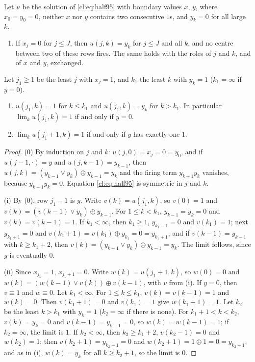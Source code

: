 \begin{lemma}\label{cl:lem:rows95}
Let $u$ be the solution of \eqref{cl:eq:half95} with boundary values $x$, $y$, where $x_0=y_0=0$, neither $x$ nor $y$ contains two consecutive $1$s, and $y_k=0$ for all large $k$.
\begin{enumerate}
\item[(0)] If $x_j=0$ for $j\le J$, then $u(j,k)=y_k$ for $j\le J$ and all $k$, and no centre between two of these rows fires. The same holds with the roles of $j$ and $k$, and of $x$ and $y$, exchanged.
\end{enumerate}
Let $j_1\ge1$ be the least $j$ with $x_j=1$, and $k_1$ the least $k$ with $y_k=1$ ($k_1=\infty$ if $y=0$).
\begin{enumerate}
\item[(i)] $u(j_1,k)=1$ for $k\le k_1$ and $u(j_1,k)=y_k$ for $k>k_1$. In particular $\lim_ku(j_1,k)=1$ if and only if $y=0$.
\item[(ii)] $\lim_ku(j_1+1,k)=1$ if and only if $y$ has exactly one $1$.
\end{enumerate}
\end{lemma}

\begin{proof}
(0) By induction on $j$ and $k$: $u(j,0)=x_j=0=y_0$, and if $u(j-1,\cdot)=y$ and $u(j,k-1)=y_{k-1}$, then $u(j,k)=(y_{k-1}\vee y_k)\oplus y_{k-1}=y_k$ and the firing term $y_{k-1}y_k$ vanishes, because $y_{k-1}y_k=0$. Equation \eqref{cl:eq:half95} is symmetric in $j$ and $k$.

(i) By (0), row $j_1-1$ is $y$. Write $v(k)=u(j_1,k)$, so $v(0)=1$ and $v(k)=(v(k-1)\vee y_k)\oplus y_{k-1}$. For $1\le k<k_1$, $y_{k-1}=y_k=0$ and $v(k)=v(k-1)=1$. If $k_1<\infty$, then $k_1\ge1$, $y_{k_1-1}=0$ and $v(k_1)=1$; next $y_{k_1+1}=0$ and $v(k_1+1)=v(k_1)\oplus y_{k_1}=0=y_{k_1+1}$; and if $v(k-1)=y_{k-1}$ with $k\ge k_1+2$, then $v(k)=(y_{k-1}\vee y_k)\oplus y_{k-1}=y_k$. The limit follows, since $y$ is eventually $0$.

(ii) Since $x_{j_1}=1$, $x_{j_1+1}=0$. Write $w(k)=u(j_1+1,k)$, so $w(0)=0$ and $w(k)=(w(k-1)\vee v(k))\oplus v(k-1)$, with $v$ from (i). If $y=0$, then $v\equiv1$ and $w\equiv0$. Let $k_1<\infty$. For $1\le k\le k_1$, $v(k)=v(k-1)=1$ and $w(k)=0$. Then $v(k_1+1)=0$ and $v(k_1)=1$ give $w(k_1+1)=1$. Let $k_2$ be the least $k>k_1$ with $y_k=1$ ($k_2=\infty$ if there is none). For $k_1+1<k<k_2$, $v(k)=y_k=0$ and $v(k-1)=y_{k-1}=0$, so $w(k)=w(k-1)=1$; if $k_2=\infty$, the limit is $1$. If $k_2<\infty$, then $k_2\ge k_1+2$, $v(k_2-1)=0$ and $w(k_2)=1$; then $v(k_2+1)=y_{k_2+1}=0$ and $w(k_2+1)=1\oplus1=0=y_{k_2+1}$, and as in (i), $w(k)=y_k$ for all $k\ge k_2+1$, so the limit is $0$.
\end{proof}

